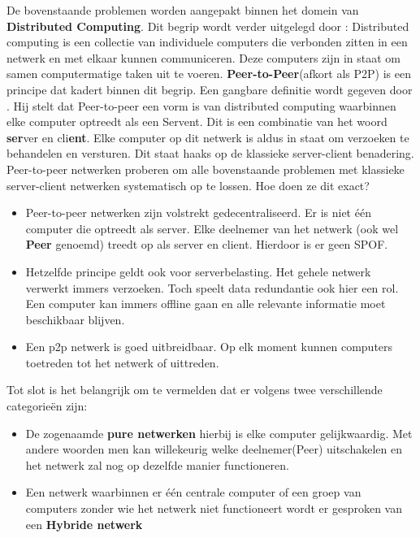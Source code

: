 De bovenstaande problemen worden aangepakt binnen het domein van \textbf{Distributed Computing}. Dit begrip wordt verder uitgelegd door \textcite{Attiya2004}: Distributed computing is een collectie van individuele computers die verbonden zitten in een netwerk en met elkaar kunnen communiceren. Deze computers zijn in staat om samen computermatige taken uit te voeren. \textbf{Peer-to-Peer}(afkort als P2P) is een principe dat kadert binnen dit begrip. Een gangbare definitie wordt gegeven door \textcite{Schollmeier2001}. Hij stelt dat Peer-to-peer een vorm is van distributed computing waarbinnen elke computer optreedt als een Servent. Dit is een combinatie van het woord \textbf{ser}ver en cli\textbf{ent}. Elke computer op dit netwerk is aldus in staat om verzoeken te behandelen en versturen. Dit staat haaks op de klassieke server-client benadering. \\

Peer-to-peer netwerken proberen om alle bovenstaande problemen met klassieke server-client netwerken systematisch op te lossen. Hoe doen ze dit exact?

\begin{itemize}
	\item Peer-to-peer netwerken zijn volstrekt gedecentraliseerd. Er is niet één computer die optreedt als server. Elke deelnemer van het netwerk (ook wel \textbf{Peer} genoemd) treedt op als server en client. Hierdoor is er geen SPOF.\\
	\item Hetzelfde principe geldt ook voor serverbelasting. Het gehele netwerk verwerkt immers verzoeken. Toch speelt data redundantie ook hier een rol. Een computer kan immers offline gaan en alle relevante informatie moet beschikbaar blijven.\\
	\item Een p2p netwerk is goed uitbreidbaar. Op elk moment kunnen computers toetreden tot het netwerk of uittreden.
\end{itemize}

Tot slot is het belangrijk om te vermelden dat er volgens \textcite{Schollmeier2001} twee verschillende categorieën zijn:

\begin{itemize}
\item De zogenaamde \textbf{pure netwerken} hierbij is elke computer gelijkwaardig. Met andere woorden men kan willekeurig welke deelnemer(Peer) uitschakelen en het netwerk zal nog op dezelfde manier functioneren.\\

\item Een netwerk waarbinnen er één centrale computer of een groep van computers zonder wie het netwerk niet functioneert wordt er gesproken van een \textbf{Hybride netwerk}
\end{itemize}


